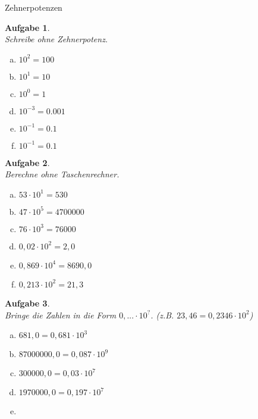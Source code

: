 \documentclass[12pt,fleqn]{article}
\theoremstyle{aufg}
\newtheorem{aufgabe}{Aufgabe}
\theoremstyle{bsp}
\begin{document}
 
    \begin{flushleft}
\begin{center}Zehnerpotenzen\end{center}\begin{aufgabe} ~ \\ 
Schreibe ohne Zehnerpotenz. \\ 
\begin{multicols}{3} 
\begin{enumerate}[a)] 
\item 
$10^{2}=100$
\item 
$10^{1}=10$
\item 
$10^{0}=1$
\item 
$10^{-3}=0.001$
\item 
$10^{-1}=0.1$
\item 
$10^{-1}=0.1$
\end{enumerate} 
\end{multicols} 
\end{aufgabe} 
\begin{aufgabe} ~ \\ 
Berechne ohne Taschenrechner. \\ 
\begin{multicols}{3} 
\begin{enumerate}[a)] 
\item 
$53\cdot10^{1}=530$
\item 
$47\cdot10^{5}=4700000$
\item 
$76\cdot10^{3}=76000$
\item 
$0,02\cdot10^{2}=2,0$
\item 
$0,869\cdot10^{4}=8690,0$
\item 
$0,213\cdot10^{2}=21,3$
\end{enumerate} 
\end{multicols} 
\end{aufgabe} 
\begin{aufgabe} ~ \\ 
Bringe die Zahlen in die Form $0,... \cdot 10^{?}$. (z.B. $23,46 = 0,2346 \cdot 10^2$) \\ 
\begin{multicols}{3} 
\begin{enumerate}[a)] 
\item 
$681,0=0,681\cdot10^{3}$
\item 
$87000000,0=0,087\cdot10^{9}$
\item 
$300000,0=0,03\cdot10^{7}$
\item 
$1970000,0=0,197\cdot10^{7}$
\item 

\end{enumerate}
\end{multicols}
\end{aufgabe}
\end{flushleft}
\end{document}
